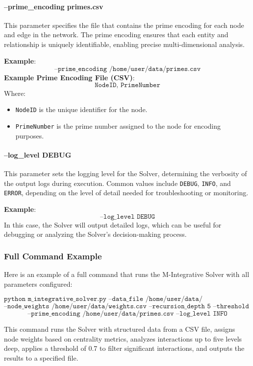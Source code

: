 \documentclass[%
 preprint, linenumbers,
 amsmath,amssymb,
 aps, physrev,
]{revtex4-2}
\begin{document}
\paragraph{--prime\_encoding primes.csv}
This parameter specifies the file that contains the prime encoding for each node and edge in the network. The prime encoding ensures that each entity and relationship is uniquely identifiable, enabling precise multi-dimensional analysis.

\textbf{Example}:
\[
\texttt{--prime\_encoding /home/user/data/primes.csv}
\]
\textbf{Example Prime Encoding File (CSV)}:
\[
\texttt{NodeID, PrimeNumber}
\]
Where:
\begin{itemize}
    \item \texttt{NodeID} is the unique identifier for the node.
    \item \texttt{PrimeNumber} is the prime number assigned to the node for encoding purposes.
\end{itemize}

\paragraph{--log\_level DEBUG}
This parameter sets the logging level for the Solver, determining the verbosity of the output logs during execution. Common values include \texttt{DEBUG}, \texttt{INFO}, and \texttt{ERROR}, depending on the level of detail needed for troubleshooting or monitoring.

\textbf{Example}:
\[
\texttt{--log\_level DEBUG}
\]
In this case, the Solver will output detailed logs, which can be useful for debugging or analyzing the Solver’s decision-making process.

\subsubsection{Full Command Example}

Here is an example of a full command that runs the M-Integrative Solver with all parameters configured:

\[
\texttt{python m\_integrative\_solver.py --data\_file /home/user/data/trafficking\_network.csv}
\]
\[
\texttt{--node\_weights /home/user/data/weights.csv --recursion\_depth 5 --threshold 0.7 --output\_file /home/user/results/analysis\_output.csv}
\]
\[
\texttt{--prime\_encoding /home/user/data/primes.csv --log\_level INFO}
\]

This command runs the Solver with structured data from a CSV file, assigns node weights based on centrality metrics, analyzes interactions up to five levels deep, applies a threshold of 0.7 to filter significant interactions, and outputs the results to a specified file.
\end{document}
